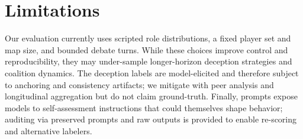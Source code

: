 \documentclass[12pt]{article}
\begin{document}
\section{Limitations}
Our evaluation currently uses scripted role distributions, a fixed player set and map size, and bounded debate turns. While these choices improve control and reproducibility, they may under-sample longer-horizon deception strategies and coalition dynamics. The deception labels are model-elicited and therefore subject to anchoring and consistency artifacts; we mitigate with peer analysis and longitudinal aggregation but do not claim ground-truth. Finally, prompts expose models to self-assessment instructions that could themselves shape behavior; auditing via preserved prompts and raw outputs is provided to enable re-scoring and alternative labelers.

\appendix
\end{document}
